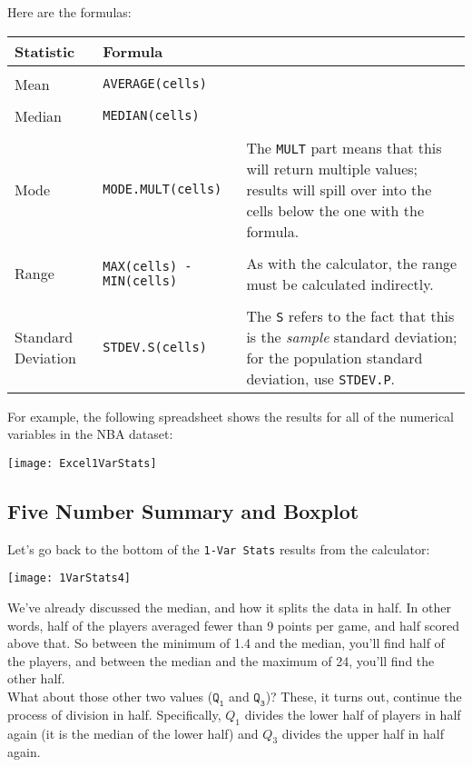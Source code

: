 Here are the formulas:
\begin{center}
\begin{tabular}{l l l}
\textbf{Statistic} & \textbf{Formula} & \\
\hline
& & \\
Mean & \texttt{AVERAGE(cells)} & \\
& & \\
Median & \texttt{MEDIAN(cells)} & \\
& & \\
Mode & \texttt{MODE.MULT(cells)} & \parbox{2in}{The \texttt{MULT} part means that this will return multiple values; results will spill over into the cells below the one with the formula.}\\
& & \\
Range & \texttt{MAX(cells) - MIN(cells)} & \parbox{2in}{As with the calculator, the range must be calculated indirectly.}\\
& & \\
Standard Deviation & \texttt{STDEV.S(cells)} & \parbox{2in}{The \texttt{S} refers to the fact that this is the \emph{sample} standard deviation; for the population standard deviation, use \texttt{STDEV.P}.}
\end{tabular}
\end{center}

For example, the following spreadsheet shows the results for all of the numerical variables in the NBA dataset:
\begin{center}
\texttt{[image: Excel1VarStats]}
\end{center}
\pagebreak

\subsection{Five Number Summary and Boxplot}
Let's go back to the bottom of the \texttt{1-Var Stats} results from the calculator:
\begin{center}
\texttt{[image: 1VarStats4]}
\end{center}

We've already discussed the median, and how it splits the data in half.  In other words, half of the players averaged fewer than 9 points per game, and half scored above that.  So between the minimum of 1.4 and the median, you'll find half of the players, and between the median and the maximum of 24, you'll find the other half.\\

What about those other two values ($\texttt{Q}_\texttt{1}$ and $\texttt{Q}_\texttt{3}$)?  These, it turns out, continue the process of division in half.  Specifically, $Q_1$ divides the lower half of players in half again (it is the median of the lower half) and $Q_3$ divides the upper half in half again.\\

